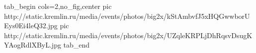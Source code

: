  
 
 
 
 


\ifcmt
  tab_begin cols=2,no_fig,center
     pic http://static.kremlin.ru/media/events/photos/big2x/kStAmbvfJ5xHQGwwborUEys0Ei4leQ32.jpg
		 pic http://static.kremlin.ru/media/events/photos/big2x/UZqleKRPLjDhRqsvDsugKYAogRdlXByL.jpg
  tab_end
\fi
